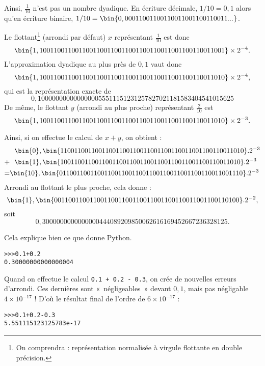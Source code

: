 Ainsi, $\frac{1}{10}$ n'est pas un nombre dyadique.  En écriture décimale, $1/10 = 0,1$ alors qu'en écriture binaire,  $1/10 = \bin{0,00011001100110011001100110011...}$.

Le flottant\footnote{On comprendra : représentation normalisée à virgule flottante en double précision.} (arrondi par défaut) $x$ représentant $\frac{1}{10}$ est donc
\begin{equation*}
 \bin{1,1001100110011001100110011001100110011001100110011001}\times 2^{-4}.
\end{equation*}
L'approximation dyadique au plus près de $0,1$ vaut donc
\begin{equation*}
 \bin{1,1001100110011001100110011001100110011001100110011010}\times 2^{-4},
\end{equation*}
qui est la représentation exacte de
\begin{equation*}
 0,1000000000000000055511151231257827021181583404541015625 
\end{equation*}
De même, le flottant $y$ (arrondi au plus proche) représentant
$\frac{2}{10}$ est
\begin{equation*}
 \bin{1,1001100110011001100110011001100110011001100110011010}\times 2^{-3} .
\end{equation*}

Ainsi, si on effectue le calcul de $x+y$, on obtient :
\small
\begin{align*}
&~~\bin{0},  \bin{11001100110011001100110011001100110011001100110011010}.
2^{-3}\\
+&~~\bin{1}, \bin{1001100110011001100110011001100110011001100110011010}.2^{-3}\\
=&\bin{10},\bin{01100110011001100110011001100110011001100110011001110}.
2^{-3}
\end{align*}
\normalsize
Arrondi au flottant le plus proche, cela donne :
\begin{equation*}
\bin{1},  \bin{0011001100110011001100110011001100110011001100110100}.2^{-2},
\end{equation*}
soit
\begin{equation*}
0,3000000000000000444089209850062616169452667236328125.
\end{equation*}

Cela explique bien ce que donne Python.
\begin{lstlisting}
>>>0.1+0.2
0.30000000000000004
\end{lstlisting}
Quand on effectue le calcul \texttt{0.1 + 0.2 - 0.3}, on crée de nouvelles erreurs d'arrondi. Ces dernières sont «~négligeables~» devant $0,1$, mais pas négligable $4\times 10^{-17}$ !
D'où le résultat final de l'ordre de $6\times 10^{-17}$ : 
\begin{lstlisting}
>>>0.1+0.2-0.3
5.551115123125783e-17
\end{lstlisting}


